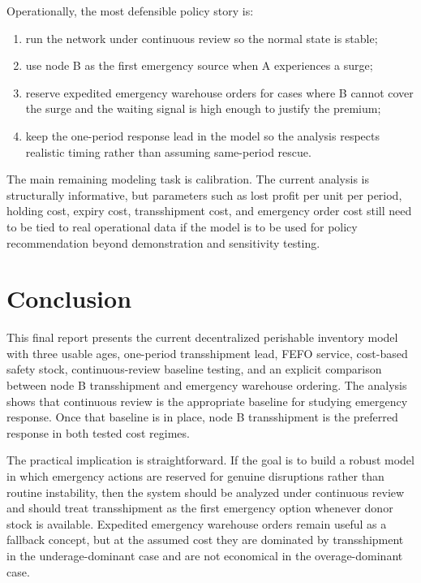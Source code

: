 \documentclass[11pt]{article}
\begin{document}
Operationally, the most defensible policy story is:
\begin{enumerate}[leftmargin=2em]
\item run the network under continuous review so the normal state is stable;
\item use node B as the first emergency source when A experiences a surge;
\item reserve expedited emergency warehouse orders for cases where B cannot cover the surge and the waiting signal is high enough to justify the premium;
\item keep the one-period response lead in the model so the analysis respects realistic timing rather than assuming same-period rescue.
\end{enumerate}

The main remaining modeling task is calibration. The current analysis is structurally informative, but parameters such as lost profit per unit per period, holding cost, expiry cost, transshipment cost, and emergency order cost still need to be tied to real operational data if the model is to be used for policy recommendation beyond demonstration and sensitivity testing.

\section{Conclusion}
This final report presents the current decentralized perishable inventory model with three usable ages, one-period transshipment lead, FEFO service, cost-based safety stock, continuous-review baseline testing, and an explicit comparison between node B transshipment and emergency warehouse ordering. The analysis shows that continuous review is the appropriate baseline for studying emergency response. Once that baseline is in place, node B transshipment is the preferred response in both tested cost regimes.

The practical implication is straightforward. If the goal is to build a robust model in which emergency actions are reserved for genuine disruptions rather than routine instability, then the system should be analyzed under continuous review and should treat transshipment as the first emergency option whenever donor stock is available. Expedited emergency warehouse orders remain useful as a fallback concept, but at the assumed cost they are dominated by transshipment in the underage-dominant case and are not economical in the overage-dominant case.

\clearpage
\appendix
\end{document}
